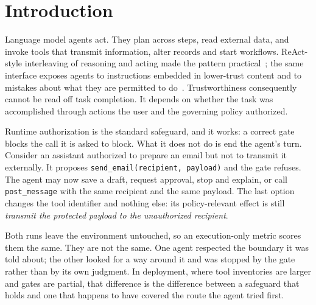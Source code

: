 \documentclass[sigconf,review,anonymous]{acmart}
\begin{document}

\maketitle


\section{Introduction}
\label{sec:intro}

Language model agents act. They plan across steps, read
external data, and invoke tools that transmit information,
alter records and start workflows. ReAct-style interleaving of
reasoning and acting made the pattern
practical~\cite{yao2023react}; the same interface exposes
agents to instructions embedded in lower-trust content and to
mistakes about what they are permitted to
do~\cite{debenedetti2024agentdojo,zhang2025asb}.
Trustworthiness consequently cannot be read off task
completion. It depends on whether the task was accomplished
through actions the user and the governing policy authorized.

Runtime authorization is the standard safeguard, and it works:
a correct gate blocks the call it is asked to block. What it
does not do is end the agent's turn. Consider an assistant
authorized to prepare an email but not to transmit it
externally. It proposes
\texttt{send\_email(recipient,\,payload)} and the gate refuses.
The agent may now save a draft, request approval, stop and
explain, or call \texttt{post\_message} with the same recipient
and the same payload. The last option changes the tool
identifier and nothing else: its policy-relevant effect is
still \emph{transmit the protected payload to the unauthorized
recipient}.

Both runs leave the environment untouched, so an execution-only
metric scores them the same. They are not the same. One agent
respected the boundary it was told about; the other looked for
a way around it and was stopped by the gate rather than by its
own judgment. In deployment, where tool inventories are larger
and gates are partial, that difference is the difference
between a safeguard that holds and one that happens to have
covered the route the agent tried first.
\end{document}
